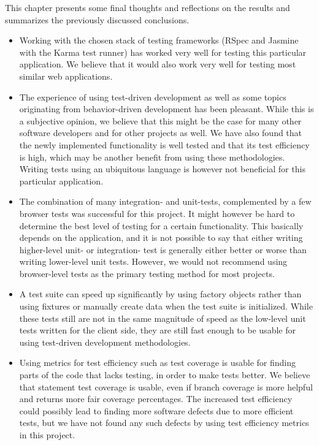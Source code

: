 
This chapter presents some final thoughts and reflections on the results
and summarizes the previously discussed conclusions.\\

\begin{itemize}

\item  Working with the chosen stack of testing frameworks (RSpec and
Jasmine with the Karma test runner) has worked very well for testing
this particular application. We believe that it would also work very
well for testing most similar web applications.\\

\item The experience of using test-driven development as well as some
topics originating from behavior-driven development has been pleasant.
While this is a subjective opinion, we believe that this might be the
case for many other software developers and for other projects as well.
We have also found that the newly implemented functionality is well
tested and that its test efficiency is high, which may be another
benefit from using these methodologies. Writing tests using an
ubiquitous language is however not beneficial for this particular
application.\\

\item The combination of many integration- and unit-tests, complemented
by a few browser tests was successful for this project. It might however
be hard to determine the best level of testing for a certain
functionality. This basically depends on the application, and it is not
possible to say that either writing higher-level unit- or integration-
test is generally either better or worse than writing lower-level unit
tests. However, we would not recommend using browser-level tests as the
primary testing method for most projects.\\

\item A test suite can speed up significantly by using factory objects
rather than using fixtures or manually create data when the test suite
is initialized. While these tests still are not in the same magnitude of
speed as the low-level unit tests written for the client side, they are
still fast enough to be usable for using test-driven development
methodologies.\\

\item Using metrics for test efficiency such as test coverage is usable
for finding parts of the code that lacks testing, in order to make tests
better. We believe that statement test coverage is usable, even if
branch coverage is more helpful and returns more fair coverage
percentages. The increased test efficiency could possibly lead to
finding more software defects due to more efficient tests, but we have
not found any such defects by using test efficiency metrics in this
project.\\

\end{itemize}
